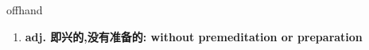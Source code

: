 
\begin{frame}
{\huge offhand}
\begin{center}
\begin{enumerate}\Large
  \item \textbf{adj. 即兴的,没有准备的: without premeditation or preparation}
\end{enumerate}
\end{center}
\end{frame}
